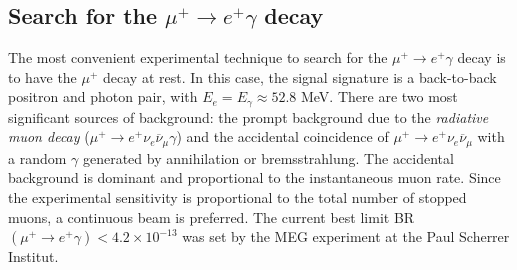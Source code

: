 \documentclass[12pt,a4paper,openright, oneside, titlepage]{book} %
\begin{document}

\subsection{Search for the $\mu^+ \rightarrow e^+ \gamma$ decay}
The most convenient experimental technique to search for the $\mu^+ \rightarrow e^+ \gamma$ decay is to have the $\mu^+$ decay at rest. 
In this case, the signal signature is a back-to-back positron and photon pair, with $E_e=E_\gamma\approx 52.8$ MeV. 
There are two most significant sources of background: the prompt background due to the \textit{radiative muon decay} ($\mu^+\rightarrow e^+ \nu_e \overline{\nu}_\mu\gamma$) and the accidental coincidence of $\mu^+\rightarrow e^+ \nu_e \overline{\nu}_\mu$ with a random $\gamma$ generated by annihilation or bremsstrahlung.
The accidental background is dominant and proportional to the instantaneous muon rate. 
Since the experimental sensitivity is proportional to the total number of stopped muons, a continuous beam is preferred.
The current best limit  BR$(\mu^+\rightarrow e^+\gamma)<4.2\times10^{-13}$ was set by the MEG experiment at the Paul Scherrer Institut\cite{MEG}.
\end{document}
